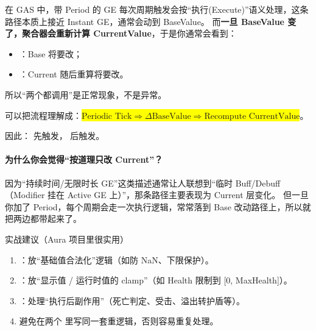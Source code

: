 \documentclass[10pt,CJKmath]{ctexart}
\begin{document}
在 GAS 中，带 Period 的 GE 每次周期触发会按“执行(Execute)”语义处理，这条路径本质上接近 Instant GE，通常会动到 BaseValue。
而\textbf{一旦 BaseValue 变了，聚合器会重新计算 CurrentValue}，于是你通常会看到：
\begin{itemize}
	\item {}：Base 将要改；
	\item {}：Current 随后重算将要改。
\end{itemize}
所以“两个都调用”是正常现象，不是异常。

可以把流程理解成：\colorbox{yellow}{$
\text{Periodic Tick} \Rightarrow \Delta \text{BaseValue} \Rightarrow \text{Recompute CurrentValue}$}。

因此： 先触发， 后触发。

\paragraph{为什么你会觉得“按道理只改 Current”？}
因为“持续时间/无限时长 GE”这类描述通常让人联想到“临时 Buff/Debuff（Modifier 挂在 Active GE 上）”，那条路径主要表现为 Current 层变化。
但一旦你加了 Period，每个周期会走一次执行逻辑，常常落到 Base 改动路径上，所以就把两边都带起来了。
\begin{lemma}
实战建议（Aura 项目里很实用）
\begin{enumerate}
	\item {}：放“基础值合法化”逻辑（如防 NaN、下限保护）。
	\item {}：放“显示值 / 运行时值的 clamp”（如 Health 限制到 [0, MaxHealth]）。
	\item {}：处理“执行后副作用”（死亡判定、受击、溢出转护盾等）。
	\item 避免在两个  里写同一套重逻辑，否则容易重复处理。
\end{enumerate}
\end{lemma}
\end{document}
